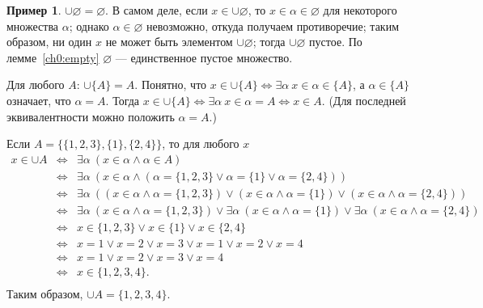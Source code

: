 \documentclass[12pt,notitlepage]{article}
\theoremstyle{plain}
\theoremstyle{definition}
\newtheorem{exm}[thm]{Пример}
\theoremstyle{plain}
\newcommand{\void}{\varnothing}
\newcommand{\1}{\mathbf{1}}
\newcommand{\0}{\mathbf{0}}
\newcommand{\mcomm}[1]{}
\begin{document}
\begin{exm}\label{sets:fin_union}
	$\cup \void = \void$. В самом деле, если $x \in \cup \void$, то $x \in \alpha \in \void$ для некоторого множества $\alpha$; однако $\alpha \in \void$ невозможно, откуда получаем противоречие; таким образом, ни один $x$ не может быть элементом $\cup \void$; тогда $\cup \void$ пустое. По лемме~\ref{ch0:empty} $\void$ --- единственное пустое множество.
	
	Для любого $A$: $\cup \{ A \} = A$. Понятно, что $x \in \cup \{ A\} \iff \exists \alpha\ x \in \alpha \in \{ A \}$, а $\alpha \in \{A \}$ означает, что $\alpha = A$. Тогда $x \in \cup \{ A\} \iff \exists \alpha\ x \in \alpha = A \iff x \in A$. (Для последней эквивалентности можно положить $\alpha = A$.)
	
	Если $A = \{ \{1,2,3\}, \{1\}, \{2,4\}\}$, то для любого $x$
	$$
	\begin{array}{rcl}
		x \in \cup A &\iff& \exists \alpha\ (x \in \alpha \wedge \alpha \in A)\\
		&\iff& \exists \alpha\ (x \in \alpha \wedge (\alpha = \{1,2,3\} \vee \alpha = \{1\} \vee \alpha = \{2,4\}))\\
		&\iff& \exists \alpha\ ((x \in \alpha \wedge \alpha = \{1,2,3\}) \vee (x \in \alpha \wedge \alpha = \{1\}) \vee (x \in \alpha \wedge \alpha = \{2,4\}))\\
		&\iff& \exists \alpha\ (x \in \alpha \wedge \alpha = \{1,2,3\}) \vee \exists \alpha\ (x \in \alpha \wedge \alpha = \{1\}) \vee \exists \alpha\ (x \in \alpha \wedge \alpha = \{2,4\})\\
		&\iff& x \in \{1,2,3\}  \vee   x \in \{1\} \vee x \in \{2,4\} \\
		&\iff& x = 1 \vee x = 2 \vee x = 3 \vee x = 1 \vee x = 2 \vee x = 4\\
		&\iff& x = 1 \vee x = 2 \vee x = 3 \vee x = 4\\
		&\iff& x \in \{1,2,3,4\}.\\
	\end{array}
	$$
	Таким образом, $\cup A = \{1,2,3,4\}$.
	
	\mcomm{For the above argument, the Instructor might wish to explain a few logical equivalences: $\exists x\, (A \vee B) \equiv \exists x\, A \vee \exists x\, B$ and $\exists x\, (A(x) \wedge x = t) \equiv A(t)$.}
\end{exm}
\end{document}
